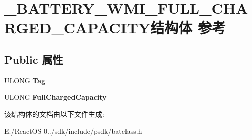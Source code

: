 \hypertarget{struct___b_a_t_t_e_r_y___w_m_i___f_u_l_l___c_h_a_r_g_e_d___c_a_p_a_c_i_t_y}{}\section{\+\_\+\+B\+A\+T\+T\+E\+R\+Y\+\_\+\+W\+M\+I\+\_\+\+F\+U\+L\+L\+\_\+\+C\+H\+A\+R\+G\+E\+D\+\_\+\+C\+A\+P\+A\+C\+I\+T\+Y结构体 参考}
\label{struct___b_a_t_t_e_r_y___w_m_i___f_u_l_l___c_h_a_r_g_e_d___c_a_p_a_c_i_t_y}
\subsection*{Public 属性}
\begin{DoxyCompactItemize}
\item 
\mbox{\label{struct___b_a_t_t_e_r_y___w_m_i___f_u_l_l___c_h_a_r_g_e_d___c_a_p_a_c_i_t_y_af9e782205634b264d456c1286e6db0aa}} 
U\+L\+O\+NG {\bfseries Tag}
\item 
\mbox{\label{struct___b_a_t_t_e_r_y___w_m_i___f_u_l_l___c_h_a_r_g_e_d___c_a_p_a_c_i_t_y_a861ddbcb00d2efd6b47a2204e7e5b7f8}} 
U\+L\+O\+NG {\bfseries Full\+Charged\+Capacity}
\end{DoxyCompactItemize}


该结构体的文档由以下文件生成\+:\begin{DoxyCompactItemize}
\item 
E\+:/\+React\+O\+S-\/0../sdk/include/psdk/batclass.\+h\end{DoxyCompactItemize}
